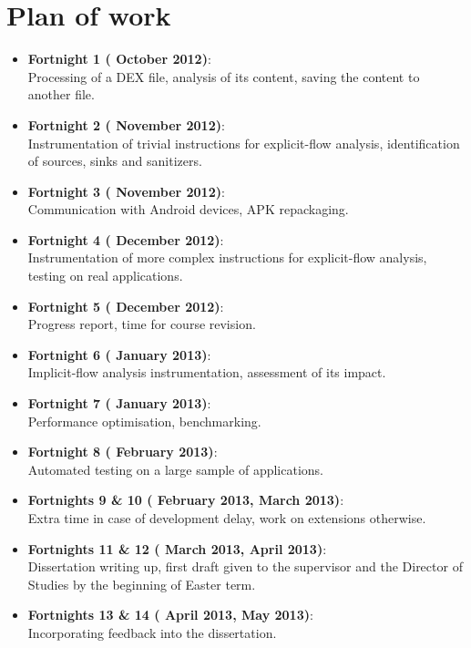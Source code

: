 \documentclass[12pt]{article}
\begin{document}
\section*{Plan of work}

\begin{itemize}

    \item{\textbf{Fortnight 1 ( October 2012)}: \\
          Processing of a DEX file, analysis of its content, saving the 
          content to another file.}
    \item{\textbf{Fortnight 2 ( November 2012)}: \\
          Instrumentation of trivial instructions for explicit-flow analysis,
          identification of sources, sinks and sanitizers.}
    \item{\textbf{Fortnight 3 ( November 2012)}: \\
          Communication with Android devices, APK repackaging.}
    \item{\textbf{Fortnight 4 ( December 2012)}: \\
          Instrumentation of more complex instructions for explicit-flow
          analysis, testing on real applications.}
    \item{\textbf{Fortnight 5 ( December 2012)}: \\
          Progress report, time for course revision.}
    \item{\textbf{Fortnight 6 ( January 2013)}: \\
          Implicit-flow analysis instrumentation, assessment of its impact.}
    \item{\textbf{Fortnight 7 ( January 2013)}: \\
          Performance optimisation, benchmarking.}
    \item{\textbf{Fortnight 8 ( February 2013)}: \\
          Automated testing on a large sample of applications.}
    \item{\textbf{Fortnights 9 \& 10 ( February 2013, 
                                        March 2013)}: \\
          Extra time in case of development delay, work on extensions
          otherwise.}
    \item{\textbf{Fortnights 11 \& 12 ( March 2013, 
                                        April 2013)}: \\
          Dissertation writing up, first draft given to the supervisor and
          the Director of Studies by the beginning of Easter term.}
    \item{\textbf{Fortnights 13 \& 14 ( April 2013, 
                                        May 2013)}: \\
         Incorporating feedback into the dissertation.}
    

\end{itemize}
\end{document}
